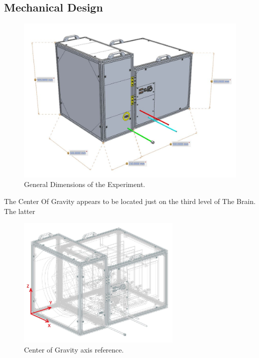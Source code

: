 \pagebreak
\subsection{Mechanical Design} \label{Mechanical_Design}

 \begin{figure}[H]
     \centering
     \includegraphics[width=1\textwidth]{4-experiment-design/img/Mechanical/tubular_dimensions.jpg}
     \caption{General Dimensions of the Experiment.}
     \label{overview}
\end{figure}



The Center Of Gravity appears to be located just on the third level of The Brain. The latter %

 \begin{figure}[H]
     \centering
     \includegraphics[width=0.7\textwidth]{4-experiment-design/img/Mechanical/COG.jpg}
     \caption{Center of Gravity axis reference.}
     \label{COG}
\end{figure}



